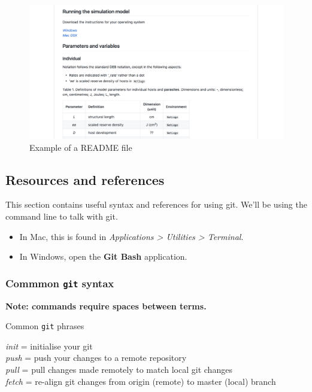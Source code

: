\documentclass[10,portrait]{article}
\providecommand{\tightlist}{%
  \setlength{\itemsep}{0pt}\setlength{\parskip}{0pt}}
\begin{document}
\begin{figure}
\centering
\includegraphics{readme.png}
\caption{Example of a README file}
\end{figure}

\newpage     

\subsection{Resources and references}\label{resources-and-references}

This section contains useful syntax and references for using git. We'll
be using the command line to talk with git.

\begin{itemize}
\tightlist
\item
  In Mac, this is found in \emph{Applications \textgreater{} Utilities
  \textgreater{} Terminal}.\\
\item
  In Windows, open the \textbf{Git Bash} application.
\end{itemize}

\subsubsection{\texorpdfstring{Commmon \texttt{git}
syntax}{Commmon git syntax}}\label{commmon-git-syntax}

\textbf{Note: commands require spaces between terms.}

Common \texttt{git} phrases

\emph{init} = initialise your git\\
\emph{push} = push your changes to a remote repository\\
\emph{pull} = pull changes made remotely to match local git changes\\
\emph{fetch} = re-align git changes from origin (remote) to master
(local) branch
\end{document}
